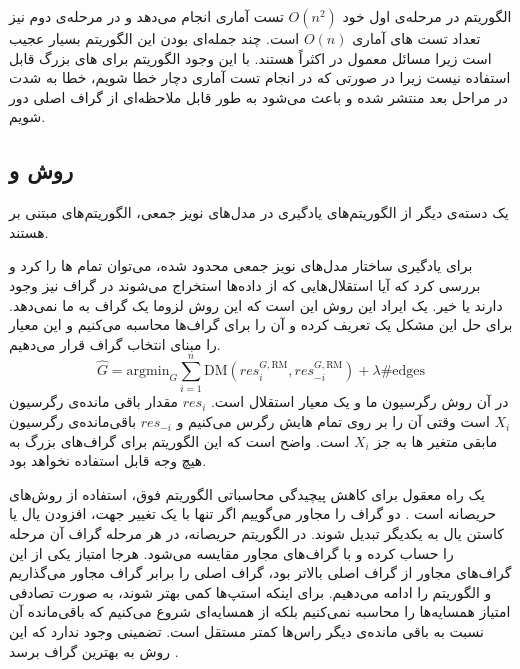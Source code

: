 \documentclass[a4paper,12pt]{article}
\def\hat{\widehat}
\begin{document}
الگوریتم 
در مرحله‌ی اول خود 
$O(n^2)$
تست آماری انجام می‌دهد و در مرحله‌ی دوم نیز تعداد تست های آماری
$O(n)$
است. چند جمله‌ای بودن این الگوریتم بسیار عجیب است زیرا مسائل معمول در 
اکثراً 
هستند. با این وجود الگوریتم 
برای  های بزرگ قابل استفاده نیست زیرا در صورتی که در انجام تست آماری دچار خطا شویم، خطا به شدت در مراحل بعد منتشر شده و باعث می‌شود به طور قابل ملاحظه‌ای از گراف اصلی دور شویم. 
\subsection{روش
	و 
}
یک دسته‌ی دیگر از الگوریتم‌های یادگیری در مدل‌های نویز جمعی، الگوریتم‌های مبتنی بر 
هستند. 

برای یادگیری ساختار مدل‌های نویز جمعی محدود شده، ‌می‌توان تمام
ها را 
کرد و بررسی کرد که آیا  استقلال‌هایی که از داده‌ها استخراج می‌شوند در گراف نیز وجود دارند  یا خیر. یک ایراد این روش  این است که این روش لزوما یک گراف
به ما نمی‌دهد. برای حل این مشکل یک 
تعریف کرده و آن را برای گراف‌ها محاسبه می‌کنیم و این معیار را مبنای انتخاب گراف قرار می‌دهیم.
$$\hat{G} = \mathrm{argmin}_G \sum_{i=1}^n \mathrm{DM}(res_i^{G, \mathrm{RM}}, res_{-i}^{G, \mathrm{RM}}) + \lambda \#\mathrm{edges}$$
در آن 
روش رگرسیون ما و 
یک معیار استقلال است.
$res_i$
مقدار باقی مانده‌ی رگرسیون $X_i$ است وقتی آن را بر روی تمام 
هایش رگرس می‌کنیم و 
$res_{-i}$
باقی‌مانده‌ی رگرسیون مابقی متغیر ها به جز $X_i$ است. واضح است که این الگوریتم برای گراف‌های بزرگ به هیچ وجه قابل استفاده نخواهد بود.

یک راه معقول برای کاهش پیچیدگی محاسباتی الگوریتم فوق، استفاده از روش‌های حریصانه است
\cite{continous}.
دو گراف را مجاور می‌گوییم اگر تنها با یک تغییر جهت، افزودن یال یا کاستن یال به یکدیگر تبدیل شوند. در الگوریتم حریصانه، در هر مرحله 
گراف آن مرحله را حساب کرده و با 
گراف‌های مجاور مقایسه‌ می‌شود. هرجا امتیاز یکی از این گراف‌های مجاور از گراف اصلی بالاتر بود، گراف اصلی را برابر گراف مجاور می‌گذاریم و الگوریتم را ادامه می‌دهیم. برای اینکه استپ‌ها کمی بهتر شوند، به صورت تصادفی امتیاز همسایه‌ها را محاسبه نمی‌کنیم بلکه از همسایه‌ای شروع می‌کنیم که باقی‌مانده آن نسبت به باقی ‌مانده‌ی دیگر راس‌ها کمتر مستقل است. تضمینی وجود ندارد که این روش به بهترین گراف برسد
\cite{continous}.
\end{document}
